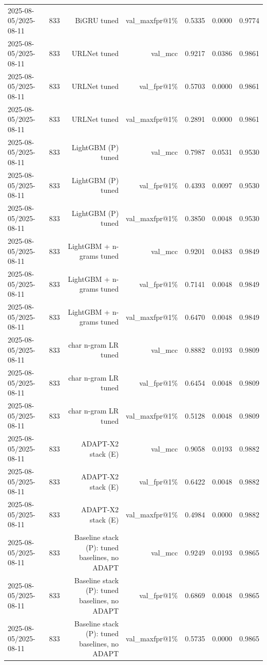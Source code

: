 \begin{table}[t]
\begin{tabular}{llrrrrr}
2025-08-05/2025-08-11 & 833 & BiGRU tuned & val\_maxfpr@1\% & 0.5335 & 0.0000 & 0.9774 \\
2025-08-05/2025-08-11 & 833 & URLNet tuned & val\_mcc & 0.9217 & 0.0386 & 0.9861 \\
2025-08-05/2025-08-11 & 833 & URLNet tuned & val\_fpr@1\% & 0.5703 & 0.0000 & 0.9861 \\
2025-08-05/2025-08-11 & 833 & URLNet tuned & val\_maxfpr@1\% & 0.2891 & 0.0000 & 0.9861 \\
2025-08-05/2025-08-11 & 833 & LightGBM (P) tuned & val\_mcc & 0.7987 & 0.0531 & 0.9530 \\
2025-08-05/2025-08-11 & 833 & LightGBM (P) tuned & val\_fpr@1\% & 0.4393 & 0.0097 & 0.9530 \\
2025-08-05/2025-08-11 & 833 & LightGBM (P) tuned & val\_maxfpr@1\% & 0.3850 & 0.0048 & 0.9530 \\
2025-08-05/2025-08-11 & 833 & LightGBM + n-grams tuned & val\_mcc & 0.9201 & 0.0483 & 0.9849 \\
2025-08-05/2025-08-11 & 833 & LightGBM + n-grams tuned & val\_fpr@1\% & 0.7141 & 0.0048 & 0.9849 \\
2025-08-05/2025-08-11 & 833 & LightGBM + n-grams tuned & val\_maxfpr@1\% & 0.6470 & 0.0048 & 0.9849 \\
2025-08-05/2025-08-11 & 833 & char n-gram LR tuned & val\_mcc & 0.8882 & 0.0193 & 0.9809 \\
2025-08-05/2025-08-11 & 833 & char n-gram LR tuned & val\_fpr@1\% & 0.6454 & 0.0048 & 0.9809 \\
2025-08-05/2025-08-11 & 833 & char n-gram LR tuned & val\_maxfpr@1\% & 0.5128 & 0.0048 & 0.9809 \\
2025-08-05/2025-08-11 & 833 & ADAPT-X2 stack (E) & val\_mcc & 0.9058 & 0.0193 & 0.9882 \\
2025-08-05/2025-08-11 & 833 & ADAPT-X2 stack (E) & val\_fpr@1\% & 0.6422 & 0.0048 & 0.9882 \\
2025-08-05/2025-08-11 & 833 & ADAPT-X2 stack (E) & val\_maxfpr@1\% & 0.4984 & 0.0000 & 0.9882 \\
2025-08-05/2025-08-11 & 833 & Baseline stack (P): tuned baselines, no ADAPT & val\_mcc & 0.9249 & 0.0193 & 0.9865 \\
2025-08-05/2025-08-11 & 833 & Baseline stack (P): tuned baselines, no ADAPT & val\_fpr@1\% & 0.6869 & 0.0048 & 0.9865 \\
2025-08-05/2025-08-11 & 833 & Baseline stack (P): tuned baselines, no ADAPT & val\_maxfpr@1\% & 0.5735 & 0.0000 & 0.9865 \\

\end{tabular}
\end{table}
